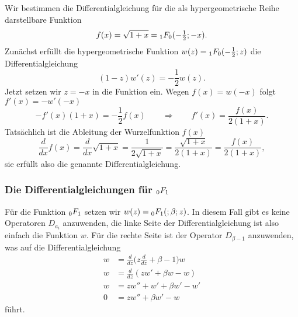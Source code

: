 \begin{beispiel}
Wir bestimmen die Differentialgleichung für die als hypergeometrische
Reihe darstellbare Funktion
\[
f(x)
=
\sqrt{1+x} = \mathstrut_1F_0(-{\textstyle\frac12};-x).
\]
Zunächst erfüllt die hypergeometrische Funktion
$w(z)=\mathstrut_1F_0(-\frac12;z)$ die Differentialgleichung
\[
(1-z)w'(z) = -\frac12 w(z).
\]
Jetzt setzen wir $z=-x$ in die Funktion ein.
Wegen $f(x)=w(-x)$ folgt $f'(x)=-w'(-x)$
\[
-f'(x)(1+x) = -\frac12 f(x)
\qquad\Rightarrow\qquad
f'(x) = \frac{f(x)}{2(1+x)}.
\]
Tatsächlich ist die Ableitung der Wurzelfunktion $f(x)$
\[
\frac{d}{dx}f(x)
=
\frac{d}{dx}\sqrt{1+x}
=
\frac{1}{2\sqrt{1+x}}
=
\frac{\sqrt{1+x}}{2(1+x)}
=
\frac{f(x)}{2(1+x)},
\]
sie erfüllt also die genannte Differentialgleichung.
\end{beispiel}

%
%
\subsubsection{Die Differentialgleichungen für $\mathstrut_0F_1$}
Für die Funktion $\mathstrut_0F_1$ setzen wir
$w(z)=\mathstrut_0F_1(;\beta;z)$.
In diesem Fall gibt es keine Operatoren $D_{a_i}$ anzuwenden, die
linke Seite der Differentialgleichung ist also einfach die Funktion $w$.
Für die rechte Seite ist der Operator $D_{\beta-1}$ anzuwenden, was auf
die Differentialgleichung
\begin{align*}
w
&=
\frac{d}{dz}
\biggl(z\frac{d}{dz}+\beta -1\biggr)w
\\
w
&=
\frac{d}{dz}(zw'+\beta w - w)
\\
w
&=
zw''+w'+\beta w' -w'
\\
0
&=
zw''+\beta w' - w
\end{align*}
führt.

